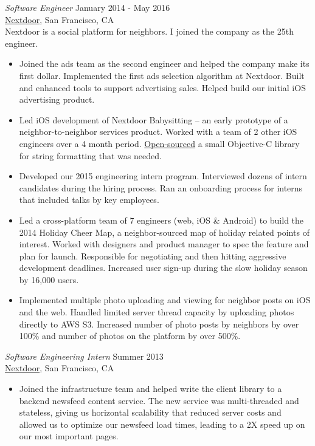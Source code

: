 \documentclass[margin, 10pt]{res}
\begin{document}
\begin{resume}
\begin{flushleft}
{\sl Software Engineer} \hfill January 2014 - May 2016 \\
\href{http://www.nextdoor.com}{Nextdoor}, San Francisco, CA \\
Nextdoor is a social platform for neighbors. I joined the company as the 25th engineer.
\begin{itemize} \itemsep -1pt %
\item Joined the ads team as the second engineer and helped the company make its first dollar. Implemented the first ads selection algorithm at Nextdoor. Built and enhanced tools to support advertising sales. Helped build our initial iOS advertising product.
\item Led iOS development of Nextdoor Babysitting -- an early prototype of a neighbor-to-neighbor services product. Worked with a team of 2 other iOS engineers over a 4 month period. \href{https://github.com/Nextdoor/NDPhraseParser}{Open-sourced} a small Objective-C library for string formatting that was needed.
\item Developed our 2015 engineering intern program. Interviewed dozens of intern candidates during the hiring process. Ran an onboarding process for interns that included talks by key employees.
\item Led a cross-platform team of 7 engineers (web, iOS \& Android) to build the 2014 Holiday Cheer Map, a neighbor-sourced map of holiday related points of interest. Worked with designers and product manager to spec the feature and plan for launch. Responsible for negotiating and then hitting aggressive development deadlines. Increased user sign-up during the slow holiday season by 16,000 users.
\item Implemented multiple photo uploading and viewing for neighbor posts on iOS and the web. Handled limited server thread capacity by uploading photos directly to AWS S3. Increased number of photo posts by neighbors by over 100\% and number of photos on the platform by over 500\%.
\end{itemize}

{\sl Software Engineering Intern} \hfill Summer 2013 \\
\href{http://www.nextdoor.com}{Nextdoor}, San Francisco, CA
\begin{itemize}
\item Joined the infrastructure team and helped write the client library to a backend newsfeed content service. The new service was multi-threaded and stateless, giving us horizontal scalability that reduced server costs and allowed us to optimize our newsfeed load times, leading to a 2X speed up on our most important pages.
\end{itemize}


\end{flushleft}
\end{resume}
\end{document}
